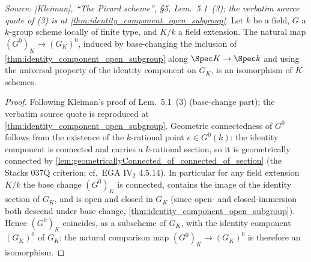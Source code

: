 \begin{theorem}

  \label{thm:identity_component_base_change_commutes}

  \textit{Source: [Kleiman], ``The Picard scheme'', \S 5,
  Lem.~5.1~(3); the verbatim source quote of (3) is at
  \cref{thm:identity_component_open_subgroup}.}
  Let \(k\) be a field, \(G\) a \(k\)-group scheme locally of finite
  type, and \(K/k\) a field extension. The natural map
  \((G^0)_K \to (G_K)^0\), induced by base-changing the inclusion of
  \cref{thm:identity_component_open_subgroup} along \(\Spec K \to \Spec k\)
  and using the universal property of the identity component on
  \(G_K\), is an isomorphism of \(K\)-schemes.
\end{theorem}

\begin{proof}
  Following Kleiman's proof of Lem.~5.1~(3) (base-change part); the
  verbatim source quote is reproduced at
  \cref{thm:identity_component_open_subgroup}.
  Geometric connectedness of \(G^0\) follows from the existence of the
  \(k\)-rational point \(e \in G^0(k)\): the identity component is
  connected and carries a \(k\)-rational section, so it is geometrically
  connected by
  \cref{lem:geometricallyConnected_of_connected_of_section} (the
  Stacks 037Q criterion; cf.\ EGA IV\(_2\) 4.5.14). In particular for
  any field extension \(K/k\) the base change \((G^0)_K\) is connected,
  contains the image of the identity section of \(G_K\), and is open and
  closed in \(G_K\) (since open- and closed-immersion both descend under
  base change, \cref{thm:identity_component_open_subgroup}). Hence
  \((G^0)_K\) coincides, as a subscheme of \(G_K\), with the identity
  component \((G_K)^0\) of \(G_K\); the natural comparison map
  \((G^0)_K \to (G_K)^0\) is therefore an isomorphism.
\end{proof}

